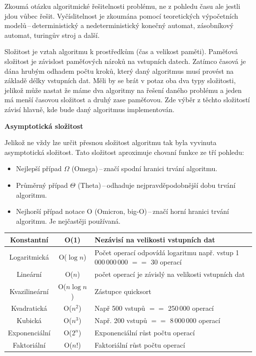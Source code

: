 Zkoumá otázku algoritmické řešitelnosti problému, ne z pohledu času ale jestli jdou vůbec řešit. Vyčíslitelnost je zkoumána pomocí teoretických výpočetních modelů\,--\,deterministický a nedeterministický konečný automat, zásobníkový automat, turingův stroj a další. 



Složitost je vztah algoritmu k prostředkům (čas a velikost paměti). Paměťová složitost je závislost paměťových nároků na vstupních datech. Zatímco časová je dána hrubým odhadem počtu kroků, který daný algoritmus musí provést na základě délky vstupních dat. Měli by se brát v potaz oba dva typy složitosti, jelikož může nastat že máme dva algoritmy na řešení daného problému a jeden má menší časovou složitost a druhý zase paměťovou. Zde výběr z těchto složitostí závisí hlavně, kde bude daný algoritmus implementován.

\begin{Large}\vspace{0,5cm} \textbf{Asymptotická složitost}
\end{Large}

Jelikož ne vždy lze určit přesnou složitost algoritmu tak byla vyvinuta asymptotická složitost. Tato složitost aproximuje chovaní funkce ze tří pohledu:
\begin{itemize}
    \item Nejlepší případ $\Omega$ (Omega)\,--\,značí spodní hranici trvání algoritmu.
    \item Průměrný případ $\Theta$ (Theta)\,--\,odhaduje nejpravděpodobnější dobu trvání algoritmu.
    \item Nejhorší případ notace O (Omicron, big-O)\,--\,značí horní hranici trvání algoritmu. Je nejčastěji používaná.
\end{itemize}

\begin{table}[h]
    \begin{tabularx}{\textwidth}{|c|c|X|}\hline
        Konstantní & O(1) & Nezávisí na velikosti vstupních dat\\\hline
        Logaritmická & O($\log{n}$) & Počet operací odpovídá logaritmu např. vstup 1\,000\,000\,000 $==$ 30 operací\\\hline
        Lineární & O($n$)& počet operací je závislý na velikosti vstupních dat\\\hline
        Kvazilineární& O($n\log{n}$)& Zástupce quicksort\\\hline
        Kvadratická& O($n^2$)& Např 500 vstupů $==$ 250\,000 operací\\\hline
        Kubická & O($n^3$)& Např. 200 vstupů $==$ 8\,000\,000 operací\\\hline
        Exponenciální&O($2^n$)& Exponenciální růst počtu operací\\\hline
        Faktoriální&O($n!$)& Faktoriální růst počtu operací\\\hline
    \end{tabularx}
\end{table}

